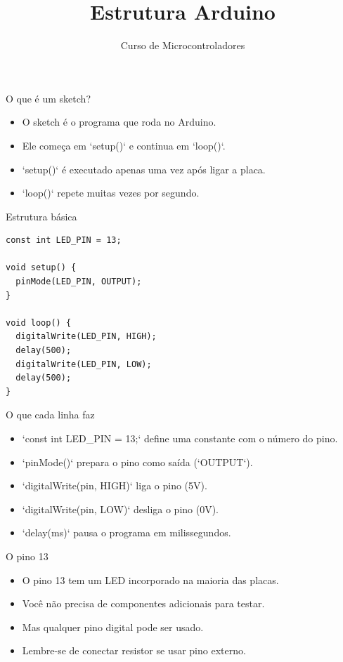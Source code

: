\documentclass[10pt]{beamer}
\title{Estrutura Arduino}
\subtitle{Curso de Microcontroladores}
\author{}
\date{}
\begin{document}
\begin{frame}
  \titlepage
\end{frame}

\begin{frame}{O que é um sketch?}
  \begin{itemize}
    \item O sketch é o programa que roda no Arduino.
    \item Ele começa em `setup()` e continua em `loop()`.
    \item `setup()` é executado apenas uma vez após ligar a placa.
    \item `loop()` repete muitas vezes por segundo.
  \end{itemize}
\end{frame}

\begin{frame}[fragile]{Estrutura básica}
\begin{lstlisting}
const int LED_PIN = 13;

void setup() {
  pinMode(LED_PIN, OUTPUT);
}

void loop() {
  digitalWrite(LED_PIN, HIGH);
  delay(500);
  digitalWrite(LED_PIN, LOW);
  delay(500);
}
\end{lstlisting}
\end{frame}

\begin{frame}{O que cada linha faz}
  \begin{itemize}
    \item `const int LED_PIN = 13;` define uma constante com o número do pino.
    \item `pinMode()` prepara o pino como saída (`OUTPUT`).
    \item `digitalWrite(pin, HIGH)` liga o pino (5V).
    \item `digitalWrite(pin, LOW)` desliga o pino (0V).
    \item `delay(ms)` pausa o programa em milissegundos.
  \end{itemize}
\end{frame}

\begin{frame}{O pino 13}
  \begin{itemize}
    \item O pino 13 tem um LED incorporado na maioria das placas.
    \item Você não precisa de componentes adicionais para testar.
    \item Mas qualquer pino digital pode ser usado.
    \item Lembre-se de conectar resistor se usar pino externo.
  \end{itemize}
\end{frame}
\end{document}
